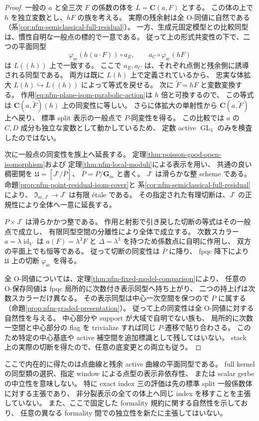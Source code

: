 \begin{proof}
一般の $a$ と全三次 $F$ の係数の体を $L=\mathbf C(a,F)$ とする。
この体の上で $h$ を独立変数とし、$hF$ の族を考える。
実際の残余射は全 O-同値に自然である
（系\ref{cor:nfm-semiclassical-full-residual}）。
一方、生成元固定模型との比較同型は、慣性自明な一般点の標的で一意である。
従って上の形式共変性の下で、二つの平面同型
\[
 \varphi_{\mathrm{sc}}(h(a\cdot F))\circ a_E,
 \qquad
 a_C\circ\varphi_{\mathrm{sc}}(hF)
\]
は $L((h))$ 上で一致する。
ここで $a_E,a_C$ は、それぞれ点側と残余側に誘導される同型である。
両方は既に $L(h)$ 上で定義されているから、
忠実な体拡大 $L(h)\hookrightarrow L((h))$ によって等式を戻せる。
次に $\widetilde F=hF$ と変数変換する。
作用\eqref{eq:nfm-plane-isom-parabolic-action}は $h$ 倍と可換するので、
この等式は $\mathbf C(a,\widetilde F)(h)$ 上の同変性に等しい。
さらに体拡大の単射性から $\mathbf C(a,\widetilde F)$ 上へ戻り、
標準 split 表示の一般点で $P$-同変性を得る。
この比較では $a$ の $C,D$ 成分も独立な変数として動かしているため、
定数 active $\operatorname{GL}_3$ のみを検査したのではない。

次に一般点の同変性を族上へ延長する。
定理\ref{thm:poisson-good-open-isomorphism}および
定理\ref{thm:nfm-local-moduli}による表示を用い、
共通の良い稠密開を $\mathfrak U=[J^\circ/\overline P]$、
$\overline P=P/\mathbf G_m$ と書く。
$J^\circ$ は滑らかな整 scheme である。
命題\ref{prop:nfm-point-residual-isom-cover}と
系\ref{cor:nfm-semiclassical-full-residual}により、
$\mathfrak I_{\mathrm{sc},J^\circ}\to J^\circ$ は有限 \'etale である。
その指定された有理切断は、$J^\circ$ の正規性により全体へ一意に延長する。

$P\times J^\circ$ は滑らかかつ整である。
作用と射影で引き戻した切断の等式はその一般点で成立し、
有限同型空間の分離性により全体で成立する。
次数スカラー $a=\lambda\operatorname{id}_V$ は
$a(F)=\lambda^3F$ と $\Delta=\lambda^3$ を持つため係数点に自明に作用し、
双方の平面上でも恒等である。
従って切断の同変性は $\overline P$ に降り、
fpqc 降下により $\mathfrak U$ 上の切断 $\varphi_{\mathrm{sc}}$ を得る。

全 O-同値については、定理\ref{thm:nfm-fixed-model-comparison}により、
任意の O-保存同値は fpqc 局所的に次数付き表示同型へ持ち上がり、
二つの持上げは次数スカラーだけ異なる。
その表示同型は中心一次空間を保つので $P$ に属する
（命題\ref{prop:nfm-graded-presentation}）。
従って上の同変性は全 O-同値に対する自然性を与える。
中心部分や support が大域で自明でない族も、
局所的に次数一空間と中心部分の flag を trivialize すれば同じ $P$-遷移で貼り合わさる。
このため特定の中心基底や active 補空間を追加標識として残してはいない。
stack 上の実際の切断を得たので、任意の底変更との両立も従う。
\end{proof}

\begin{remark}[この降下の範囲]
ここで内在的に得たのは点曲線と残余 active 曲線の平面同型である。
full kernel の同型類の選択、指定 window による点型の表示非依存性、
または scalar gerbe の中立性を意味しない。
特に exact index 三の評価は先の標準 split 一般係数体に対する主張であり、
非分裂表示の全ての体上へ同じ index を移すことを主張していない。
また、ここで固定した formality 規約に関する自然性を示しており、
任意の異なる formality 間での独立性を新たに主張してはいない。
\end{remark}
